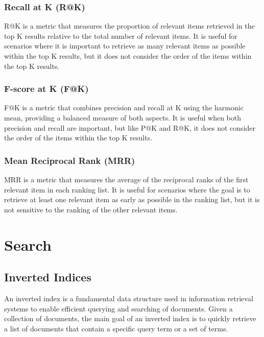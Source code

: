 \documentclass[12pt]{article}
\begin{document}
\subsubsection{Recall at K (R@K)} R@K is a metric that measures the proportion of relevant items retrieved in the top K results relative to the total number of relevant items. It is useful for scenarios where it is important to retrieve as many relevant items as possible within the top K results, but it does not consider the order of the items within the top K results.

\subsubsection{F-score at K (F@K)} F@K is a metric that combines precision and recall at K using the harmonic mean, providing a balanced measure of both aspects. It is useful when both precision and recall are important, but like P@K and R@K, it does not consider the order of the items within the top K results.

\subsubsection{Mean Reciprocal Rank (MRR)} MRR is a metric that measures the average of the reciprocal ranks of the first relevant item in each ranking list. It is useful for scenarios where the goal is to retrieve at least one relevant item as early as possible in the ranking list, but it is not sensitive to the ranking of the other relevant items.


\section{Search}
\subsection{Inverted Indices}
An inverted index is a fundamental data structure used in information retrieval systems to enable efficient querying and searching of documents. Given a collection of documents, the main goal of an inverted index is to quickly retrieve a list of documents that contain a specific query term or a set of terms.
\end{document}
